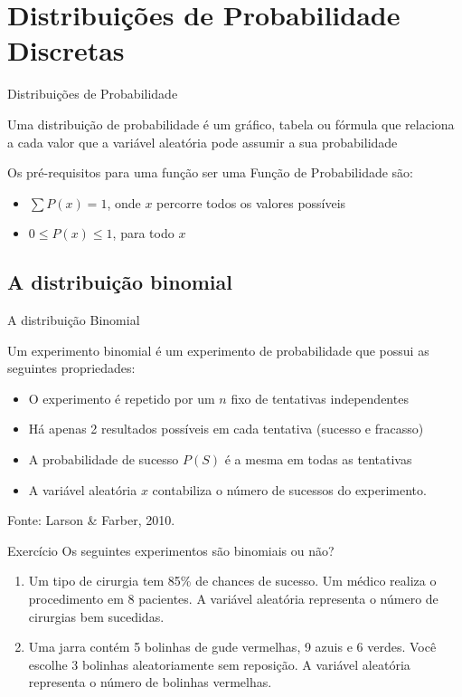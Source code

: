 \documentclass{beamer}
\begin{document}
\section[Distribuições Discretas]{Distribuições de Probabilidade Discretas}
\begin{frame}{Distribuições de Probabilidade}
  \begin{definition}
    Uma \alert{distribuição de probabilidade} é um gráfico, tabela ou
    fórmula que relaciona a cada valor que a variável aleatória pode
    assumir a sua probabilidade
  \end{definition}
  Os pré-requisitos para uma função ser uma Função de Probabilidade
  são:
  \begin{itemize}
  \item $\sum P(x) = 1$, onde $x$ percorre todos os valores possíveis
  \item $0 \le P(x) \le 1$, para todo $x$
  \end{itemize}
\end{frame}

\subsection{A distribuição binomial}

\begin{frame}{A distribuição Binomial}
  \begin{definition}
    Um \alert{experimento binomial} é um experimento de probabilidade que possui as seguintes propriedades:

    \begin{itemize}
    \item O experimento é repetido por um $n$ fixo de tentativas independentes
    \item Há apenas 2 resultados possíveis em cada tentativa (sucesso e fracasso)
    \item A probabilidade de sucesso $P(S)$ é a mesma em todas as tentativas
    \item A variável aleatória $x$ contabiliza o número de sucessos do experimento.
    \end{itemize}
  \end{definition}

Fonte: Larson \& Farber, 2010.
\end{frame}

\begin{frame}{Exercício}
Os seguintes experimentos são binomiais ou não?
  \begin{block}{}
    \begin{enumerate}
    \item Um tipo de cirurgia tem 85\% de chances de sucesso.
      Um médico realiza o procedimento em 8 pacientes.
      A variável aleatória representa o número de cirurgias bem sucedidas.
    \item Uma jarra contém 5 bolinhas de gude vermelhas, 9 azuis e 6 verdes.
      Você escolhe 3 bolinhas aleatoriamente sem reposição.
      A variável aleatória representa o número de bolinhas vermelhas.
    \end{enumerate}
  \end{block}
\end{frame}
\end{document}
